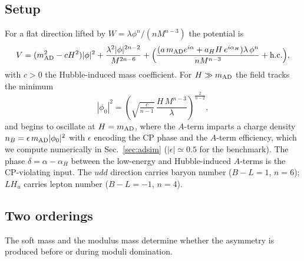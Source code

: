 \documentclass[11pt]{article}
\begin{document}
\subsection{Setup}
For a flat direction lifted by $W=\lambda\phi^n/(nM^{n-3})$ the potential is
\begin{equation}
V=(m_{\rm AD}^2-cH^2)|\phi|^2+\frac{\lambda^2|\phi|^{2n-2}}{M^{2n-6}}+\Big(\frac{(a\,m_{\rm AD}e^{i\alpha}+a_HH\,e^{i\alpha_H})\lambda\,\phi^n}{nM^{n-3}}+\text{h.c.}\Big),\label{eq:adpot}
\end{equation}
with $c>0$ the Hubble-induced mass coefficient. For $H\gg m_{\rm AD}$ the field tracks the minimum
\begin{equation}
|\phi_0|^{2}=\left(\sqrt{\tfrac{c}{n-1}}\,\frac{H\,M^{n-3}}{\lambda}\right)^{\frac{2}{n-2}},\label{eq:phi0}
\end{equation}
and begins to oscillate at $H=m_{\rm AD}$, where the $A$-term imparts a charge density $n_B=\epsilon\,m_{\rm AD}|\phi_0|^2$ with $\epsilon$ encoding the CP phase and the $A$-term efficiency, which we compute numerically in Sec.~\ref{sec:adsim} ($|\epsilon|\simeq0.5$ for the benchmark). The phase $\delta=\alpha-\alpha_H$ between the low-energy and Hubble-induced $A$-terms is the CP-violating input. The $udd$ direction carries baryon number ($B-L=1$, $n=6$); $LH_u$ carries lepton number ($B-L=-1$, $n=4$).

\subsection{Two orderings}
The soft mass and the modulus mass determine whether the asymmetry is produced before or during moduli domination.
\end{document}
